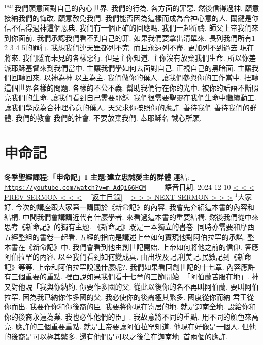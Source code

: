 \documentclass{book}
\begin{document}
$^{1841}$我們願意面對自己的內心世界.
我們的行為.
各方面的罪惡.
然後信得過神.
願意接納我們的悔改.
願意赦免我們.
我們能否因為這樣而成為合神心意的人.
關鍵是你信不信得過神這個恩典.
我們有一個正確的回應嗎.
我們一起祈禱.
師父上帝我們來到你面前.
我們承認我們看不到自己的罪.
如果我們要拿出清單來.
長列我們所有1 2 3 4 5的罪行.
我想我們連天罡都列不完.
而且永遠列不盡.
更加列不到過去 現在 將來.
我們隱而未見的各樣惡行.
但是主你知道.
主你沒有放棄我們生命.
所以你差派耶穌基督來到我們當中.
主讓我們學如何去面對自己.
正視自己的黑暗面.
主讓我們回轉回來.
以神為神 以主為主.
我們做你的僕人.
讓我們參與你的工作當中.
扭轉這個世界各樣的問題.
各樣的不公不義.
幫助我們行在你的光中.
被你的話語不斷照亮我們的生命.
讓我們看到自己需要耶穌.
我們很需要聖靈在我們生命中繼續動工.
讓我們學成為合神理心意的僕人.
天父求你按照你的應許.
善待我們 善待我們的群體.
我們的教會 我們的社會.
不要放棄我們.
奉耶穌名 誠心所願.
\newpage



\section{申命記}
\label{sec:m_AdQi66HCM}
\textbf{冬季聖經課程:「申命記」I 主題:建立忠誠愛主的群體}
\newline
\newline
連結: \href{https://youtube.com/watch?v=m-AdQi66HCM}{\texttt{ https://youtube.com/watch?v=m-AdQi66HCM}} ~~~~ 語音日期: 2024-12-10 
\newline
\newline
\hyperref[sec:_dFYhclLeWU]{\small{< < < PREV SERMON < < <}}
~
\hyperref[sec:index]{\small{[返主目錄]}}
~
\hyperref[sec:0UjUn93f77k]{\small{> > > NEXT SERMON > > >}}
\newline
\newline
$^{1}$大家好.
今次的講座跟大家第一講關於《新命記》的內容.
我會先介紹這本書的內容和結構.
中間我們會講講近代有什麼學者.
來看過這本書的重要結構.
然後我們從中來思考《新命記》的獨有主題.
《新命記》既是一本獨立的書卷.
同時亦需要和摩西五經整組的書卷一起看.
五經的指向是講述上帝如何實現他對阿伯拉罕的承諾.
整本書在《新命記》中.
我們會看到他由創世記開始.
上帝如何將他之前的信仰.
答應阿伯拉罕的內容.
以至我們看到如何變成真.
由出埃及記,利美記,民數記到《新命記》等等.
上帝和阿伯拉罕說過什麼呢?.
我們如果看回創世記的十七章.
內容應許有三個重要的重點.
裡面說如果我們看十七章的三節開始.
「阿伯蘭苦服在地」.
神又對他說「我與你納約.
你要作多國的父.
從此以後你的名不再叫阿伯蘭.
要叫阿伯拉罕.
因為我已納你作多國的父.
我必使你的後裔極其繁多.
國度從你而納 君王從你而出.
我要作你和你後裔的臣.
我要將你現在寄居的地.
就是迦南全地.
設給你和你的後裔永遠為業.
我也必作他們的臣」.
我故意將不同的重點.
用不同的顏色來高亮.
應許的三個重要重點.
就是上帝要讓阿伯拉罕知道.
他現在好像是一個人.
但他的後裔是可以極其繁多.
還有他們是可以之後住在迦南地.
首兩個的應許.
\end{document}
